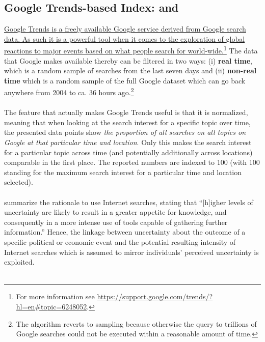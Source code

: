 \documentclass[a4paper,12pt,oneside,pointednumbers,bibtotoc,bigheadings,liststotoc]{scrbook}
\begin{document}
\subsection{Google Trends-based Index: \citet{bontempietal:16} and \citet{castelnuovoandtran:17}}
\label{sec:googletrends}
\href{https://medium.com/google-news-lab/what-is-google-trends-data-and-what-does-it-mean-b48f07342ee8}{Google Trends is a freely available Google service derived from Google search data. As such it is a powerful tool when it comes to the exploration of global reactions to major events based on what people search for world-wide.}\footnote{For more information see \url{https://support.google.com/trends/?hl=en\#topic=6248052}.} The data that Google makes available thereby can be filtered in two ways: (i) \textbf{real time}, which is a random sample of searches from the last seven days and (ii) \textbf{non-real time} which is a random sample of the full Google dataset which can go back anywhere from 2004 to ca. 36 hours ago.\footnote{The algorithm reverts to sampling because otherwise the query to trillions of Google searches could not be executed within a reasonable amount of time.} 
\\
\\
The feature that actually makes Google Trends useful is that it is normalized, meaning that when looking at the search interest for a specific topic over time, the presented data points show \textit{the proportion of all searches on all topics on Google at that particular time and location}. Only this makes the search interest for a particular topic across time (and potentially additionally across locations) comparable in the first place. The reported numbers are indexed to 100 (with 100 standing for the maximum search interest for a particular time and location selected). \\
\\
\citet[p. 3]{bontempietal:16} summarize the rationale to use Internet searches, stating that ``[h]igher levels of uncertainty are likely to result in a greater appetite for knowledge, and consequently in a more intense use of tools capable of gathering further information.'' Hence, the linkage between uncertainty about the outcome of a specific political or economic event and the potential resulting intensity of Internet searches which is assumed to mirror individuals' perceived uncertainty is exploited. \\
\\
\end{document}
